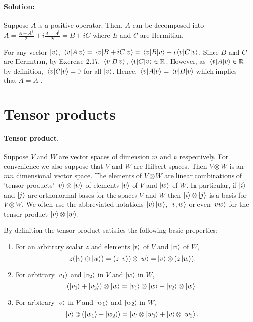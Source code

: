 \paragraph{Solution:} Suppose $A$ is a positive operator. Then, $A$ can be
decomposed into $A = \frac{A + A^\dagger}{2} + i\frac{A - A^\dagger}{2i} = B +
iC$ where $B$ and $C$ are Hermitian.

For any vector $\ket{v}$, $\mel{v}{A}{v} = \mel{v}{B + iC}{v} = \mel{v}{B}{v} +
i\mel{v}{C}{v}$. Since $B$ and $C$ are Hermitian, by Exercise 2.17,
$\mel{v}{B}{v}, \mel{v}{C}{v} \in \mathbb{R}$. However, as $\mel{v}{A}{v} \in
\mathbb{R}$ by definition, $\mel{v}{C}{v} = 0$ for all $\ket{v}$. Hence,
$\mel{v}{A}{v} = \mel{v}{B}{v}$ which implies that $A = A^\dagger$.

\section{Tensor products}

\paragraph{Tensor product.} Suppose $V$ and $W$ are vector spaces of dimension
$m$ and $n$ respectively. For convenience we also suppose that $V$ and $W$ are
Hilbert spaces. Then $V \otimes W$ is an $mn$ dimensional vector space. The
elements of $V \otimes W$ are linear combinations of 'tensor products' $\ket{v}
\otimes \ket{w}$ of elements $\ket{v}$ of $V$ and $\ket{w}$ of $W$. In
particular, if $\ket{i}$ and $\ket{j}$ are orthonormal bases for the spaces $V$
and $W$ then $\ket{i} \otimes \ket{j}$ is a basis for $V \otimes W$. We often
use the abbreviated notations $\ket{v}\ket{w}$, $\ket{v, w}$ or even $\ket{vw}$
for the tensor product $\ket{v} \otimes \ket{w}$.

By definition the tensor product satisfies the following basic properties:
\begin{enumerate}
  \item For an arbitrary scalar $z$ and elements $\ket{v}$ of $V$ and $\ket{w}$
    of $W$, \begin{equation*}
      z(\ket{v} \otimes \ket{w}) = (z\ket{v}) \otimes \ket{w} = \ket{v} \otimes
      (z\ket{w}).
    \end{equation*}
  \item For arbitrary $\ket{v_1}$ and $\ket{v_2}$ in $V$ and $\ket{w}$ in $W$,
    \begin{equation*}
      (\ket{v_1} + \ket{v_2}) \otimes \ket{w} = \ket{v_1} \otimes \ket{w} +
      \ket{v_2} \otimes \ket{w}.
    \end{equation*}
  \item For arbitrary $\ket{v}$ in $V$ and $\ket{w_1}$ and $\ket{w_2}$ in $W$,
    \begin{equation*}
      \ket{v} \otimes (\ket{w_1} + \ket{w_2}) = \ket{v} \otimes \ket{w_1} +
      \ket{v} \otimes \ket{w_2}.
    \end{equation*}
\end{enumerate}

